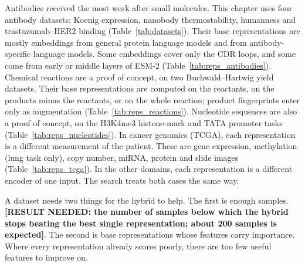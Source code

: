 Antibodies received the most work after small molecules. This chapter uses four antibody datasets: Koenig expression, nanobody thermostability, humanness and trastuzumab--HER2 binding (Table~\ref{tab:datasets}). Their base representations are mostly embeddings from general protein language models and from antibody-specific language models. Some embeddings cover only the CDR loops, and some come from early or middle layers of ESM-2 (Table~\ref{tab:reps_antibodies}). Chemical reactions are a proof of concept, on two Buchwald--Hartwig yield datasets. Their base representations are computed on the reactants, on the products minus the reactants, or on the whole reaction; product fingerprints enter only as augmentation (Table~\ref{tab:reps_reactions}). Nucleotide sequences are also a proof of concept, on the H3K4me3 histone-mark and TATA promoter tasks (Table~\ref{tab:reps_nucleotides}). In cancer genomics (TCGA), each representation is a different measurement of the patient. These are gene expression, methylation (lung task only), copy number, miRNA, protein and slide images (Table~\ref{tab:reps_tcga}). In the other domains, each representation is a different encoder of one input. The search treats both cases the same way.

A dataset needs two things for the hybrid to help. The first is enough samples. \textbf{[RESULT NEEDED: the number of samples below which the hybrid stops beating the best single representation; about 200 samples is expected]}. The second is base representations whose features carry importance. Where every representation already scores poorly, there are too few useful features to improve on.


